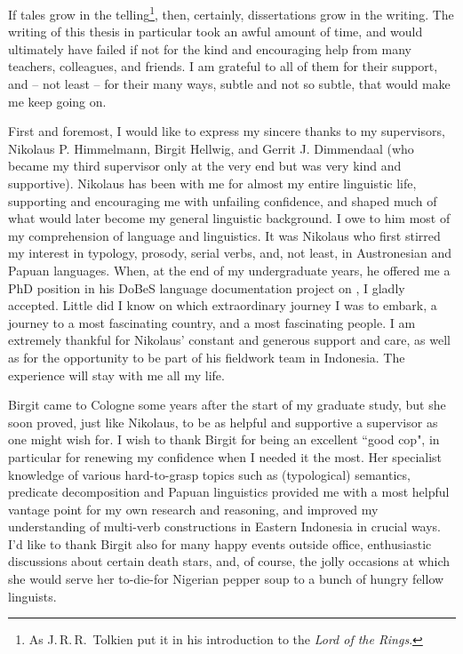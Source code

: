 
If tales grow in the telling\footnote{As J.\,R.\,R.\, Tolkien put it in his introduction to the \textit{Lord of the Rings}.}, then, certainly, dissertations grow in the writing. The writing of this thesis in particular took an awful amount of time, and would ultimately have failed if not for the kind and encouraging help from many teachers, colleagues, and friends. I am grateful to all of them for their support, and -- not least -- for their many ways, subtle and not so subtle, that would make me keep going on.

First and foremost, I would like to express my sincere thanks to my supervisors, Nikolaus P. Himmelmann, Birgit Hellwig, and Gerrit J. Dimmendaal (who became my third supervisor only at the very end but was very kind and supportive). Nikolaus has been with me for almost my entire linguistic life, supporting and encouraging me with unfailing confidence, and shaped much of what would later become my general linguistic background. I owe to him most of my comprehension of language and linguistics. It was Nikolaus who first stirred my interest in typology, prosody, serial verbs, and, not least, in Austronesian and Papuan languages. When, at the end of my undergraduate years, he offered me a PhD position in his DoBeS language documentation project on , I gladly accepted. Little did I know on which extraordinary journey I was to embark, a journey to a most fascinating country, and a most fascinating people. I am extremely thankful for Nikolaus' constant and generous support and care, as well as for the opportunity to be part of his fieldwork team in Indonesia. The experience will stay with me all my life.

Birgit came to Cologne some years after the start of my graduate study, but she soon proved, just like Nikolaus, to be as helpful and supportive a supervisor as one might wish for. I wish to thank Birgit for being an excellent ``good cop", in particular for renewing my confidence when I needed it the most. Her specialist knowledge of various hard-to-grasp topics such as (typological) semantics, predicate decomposition and Papuan linguistics provided me with a most helpful vantage point for my own research and reasoning, and improved my understanding of multi-verb constructions in Eastern Indonesia in crucial ways. I'd like to thank Birgit also for many happy events outside office, enthusiastic discussions about certain death stars, and, of course, the jolly occasions at which she would serve her to-die-for Nigerian pepper soup to a bunch of hungry fellow linguists.

